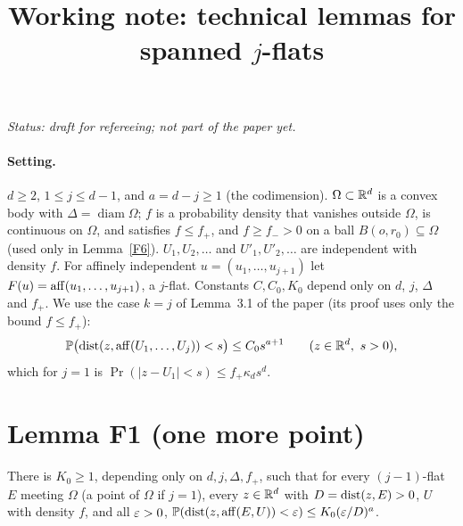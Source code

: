 \documentclass[11pt]{article}
\title{Working note: technical lemmas for spanned $j$-flats}
\date{}
\begin{document}
\maketitle

\noindent\emph{Status: draft for refereeing; not part of the paper yet.}

\paragraph{Setting.} $d\ge2$, $1\le j\le d-1$, and $a=d-j\ge1$ (the codimension). $\Omega\subset\mathbb{R}^d$ is a convex body with
$\Delta=\operatorname{diam}\Omega$; $f$ is a probability density that vanishes outside $\Omega$, is continuous on $\Omega$, and satisfies
$f\le f_+$, and $f\ge f_->0$ on a ball $B(o,r_0)\subseteq\Omega$ (used only in Lemma~\ref{F6}). $U_1,U_2,\dots$ and $U'_1,U'_2,\dots$ are independent with density $f$. For affinely independent
$u=(u_1,\dots,u_{j+1})$ let $F(u)=\operatorname{aff}(u_1,\dots,u_{j+1})$, a $j$-flat. Constants $C,C_0,K_0$ depend only on $d$, $j$, $\Delta$ and
$f_+$. We use the case $k=j$ of Lemma~3.1 of the paper (its proof uses only the bound $f\le f_+$):
\begin{equation}\label{eq:flat}
  \mathbb{P}\bigl(\operatorname{dist}(z,\operatorname{aff}(U_1,\dots,U_j))<s\bigr)\le C_0s^{a+1}\qquad(z\in\mathbb{R}^d,\ s>0),
\end{equation}
which for $j=1$ is $\Pr(|z-U_1|<s)\le f_+\kappa_ds^d$.

\section*{Lemma F1 (one more point)}

\begin{lemma}\label{F1}
There is $K_0\ge1$, depending only on $d,j,\Delta,f_+$, such that for every $(j-1)$-flat $E$ meeting $\Omega$ (a point of
$\Omega$ if $j=1$), every $z\in\mathbb{R}^d$ with $D=\operatorname{dist}(z,E)>0$, $U$ with density $f$, and all $\varepsilon>0$,
$\mathbb{P}(\operatorname{dist}(z,\operatorname{aff}(E,U))<\varepsilon)\le K_0(\varepsilon/D)^a$.
\end{lemma}
\end{document}
